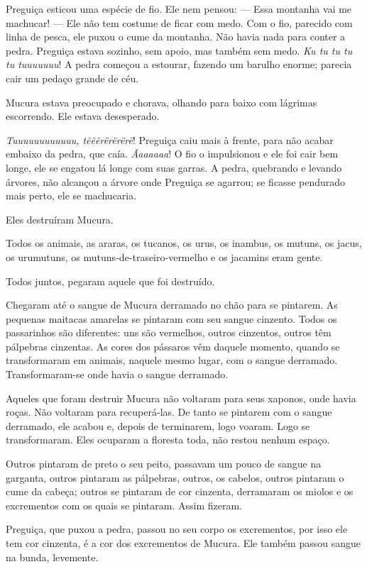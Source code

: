 Preguiça esticou uma espécie de fio. Ele nem pensou: --- Essa montanha vai
me machucar! --- Ele não tem costume de ficar com medo. Com o fio,
parecido com linha de pesca, ele puxou o cume da montanha. Não havia
nada para conter a pedra. Preguiça estava sozinho, sem apoio, mas também
sem medo. \textit{Ku tu tu tu tu tuuuuuuu}! A pedra começou a estourar,
fazendo um barulho enorme; parecia cair um pedaço grande de céu. 

Mucura estava preocupado e chorava, olhando para baixo com lágrimas
escorrendo. Ele estava desesperado. 

\textit{Tuuuuuuuuuuuu, tẽẽẽrërërërë}! Preguiça caiu mais à frente, para
não acabar embaixo da pedra, que caía. \textit{Ãaaaaaa}! O fio o
impulsionou e ele foi cair bem longe, ele se engatou lá longe com suas
garras. A pedra, quebrando e levando árvores, não alcançou a árvore onde
Preguiça se agarrou; se ficasse pendurado mais perto, ele se
machucaria. 

Eles destruíram Mucura. 

Todos os animais, as araras, os tucanos, os urus, os inambus, os mutuns,
os jacus, os urumutuns, os mutuns-de-traseiro-vermelho e os jacamins
eram gente. 

Todos juntos, pegaram aquele que foi destruído. 

Chegaram até o sangue de Mucura derramado no chão para se pintarem. As
pequenas maitacas amarelas se pintaram com seu sangue cinzento. Todos os
passarinhos são diferentes: uns são vermelhos, outros cinzentos, outros
têm pálpebras cinzentas. As cores dos pássaros vêm daquele momento,
quando se transformaram em animais, naquele mesmo lugar, com o sangue
derramado. Transformaram-se onde havia o sangue derramado. 

Aqueles que foram destruir Mucura não voltaram para seus xaponos, onde
havia roças. Não voltaram para recuperá-las. De tanto se pintarem com o
sangue derramado, ele acabou e, depois de terminarem, logo voaram. Logo
se transformaram. Eles ocuparam a floresta toda, não restou nenhum
espaço. 

Outros pintaram de preto o seu peito, passavam um pouco de sangue na
garganta, outros pintaram as pálpebras, outros, os cabelos, outros
pintaram o cume da cabeça; outros se pintaram de cor cinzenta,
derramaram os miolos e os excrementos com os quais se pintaram. Assim
fizeram. 

Preguiça, que puxou a pedra, passou no seu corpo os excrementos, por
isso ele tem cor cinzenta, é a cor dos excrementos de Mucura. Ele também
passou sangue na bunda, levemente. 

